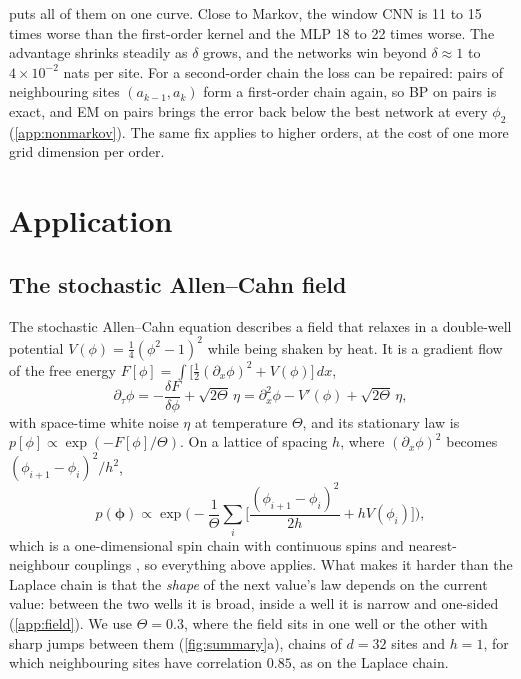 \documentclass{article}
\begin{document}
 puts all of them on one curve. Close to Markov, the window CNN is 11 to 15 times worse than
the first-order kernel and the MLP 18 to 22 times worse. The advantage shrinks steadily as $\delta$ grows, and the
networks win beyond $\delta\approx1$ to $4\times10^{-2}$ nats per site. For a second-order chain the loss can be
repaired: pairs of neighbouring sites $(a_{k-1},a_k)$ form a first-order chain again, so BP on pairs is exact, and EM on
pairs brings the error back below the best network at every $\phi_2$ (\cref{app:nonmarkov}). The same fix applies to
higher orders, at the cost of one more grid dimension per order.

\section{Application}
\label{sec:applications}

\subsection{The stochastic Allen--Cahn field}
\label{sec:allen-cahn}

The stochastic Allen--Cahn equation \cite{allen1979microscopic,dapratozabczyk2014} describes a field that relaxes in a
double-well potential $V(\phi)=\tfrac14(\phi^2-1)^2$ while being shaken by heat. It is a gradient flow of the free
energy $F[\phi]=\int\big[\tfrac12(\partial_x\phi)^2+V(\phi)\big]\,dx$,
\begin{equation}
  \partial_\tau\phi=-\frac{\delta F}{\delta\phi}+\sqrt{2\Theta}\,\eta
  =\partial_x^2\phi-V'(\phi)+\sqrt{2\Theta}\,\eta,
\end{equation}
with space-time white noise $\eta$ at temperature $\Theta$, and its stationary law is $p[\phi]\propto\exp(-F[\phi]/\Theta)$.
On a lattice of spacing $h$, where $(\partial_x\phi)^2$ becomes $(\phi_{i+1}-\phi_i)^2/h^2$,
\begin{equation}
  p(\boldsymbol\phi)\propto\exp\Big(-\frac1\Theta\sum_i\Big[\frac{(\phi_{i+1}-\phi_i)^2}{2h}+hV(\phi_i)\Big]\Big),
\end{equation}
which is a one-dimensional spin chain with continuous spins and nearest-neighbour couplings
\cite{achilli2026speciation}, so everything above applies. What makes it harder than the Laplace chain is that the
\emph{shape} of the next value's law depends on the current value: between the two wells it is broad, inside a well it
is narrow and one-sided (\cref{app:field}). We use $\Theta=0.3$, where the field sits in one well or the other with sharp
jumps between them (\cref{fig:summary}a), chains of $d=32$ sites and $h=1$, for which neighbouring sites have
correlation $0.85$, as on the Laplace chain.
\end{document}
